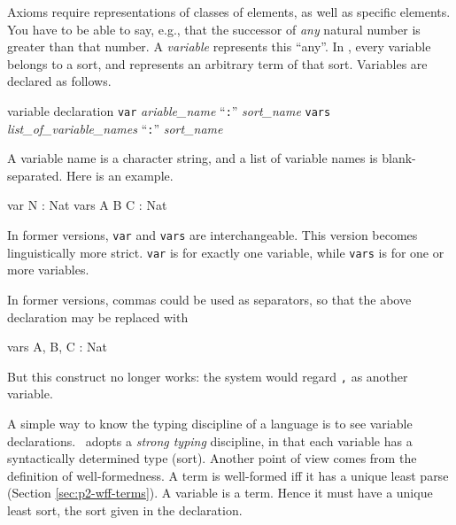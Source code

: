 \documentclass[a4paper]{memoir}
\begin{document}
Axioms require representations of classes of elements, as well as
specific elements. You have to be able to say, e.g., that
the successor of {\em any} natural number is greater than that number.
A {\em variable} represents this ``any''.
In \cafeobj, every variable belongs to a sort, and represents an arbitrary
term of that sort.
Variables are declared as follows.

\begin{bsyntax} variable declaration  \Hline
\texttt{var} \textit{ariable\_name} ``\texttt{:}'' \textit{sort\_name}
\texttt{vars} \textit{list\_of\_variable\_names} ``\texttt{:}'' \textit{sort\_name}
\end{bsyntax}

A variable name is a character string, and a list of variable names
is blank-separated. Here is an example.
\begin{vvtm}
\begin{ccode}
  var N : Nat 
  vars A B C : Nat
\end{ccode}
\end{vvtm}
\begin{warning}
  In former versions, \verb|var| and \verb|vars| are interchangeable.
  This version becomes linguistically more strict.
  \verb|var| is for exactly one variable, while \verb|vars| is for
  one or more variables.
\end{warning}

\begin{warning}
  In former versions, commas could be used as separators, so that the
  above  declaration may be replaced with
  \begin{vvtm}
\begin{ccode}
    vars A, B, C : Nat
  \end{ccode}
\end{vvtm}
  But this construct no longer works: the system would regard \verb|,| as
  another variable.
\end{warning}

A simple way to know the typing discipline of a language is to see
variable declarations. \cafeobj~adopts a {\em strong typing}
 discipline,
in that each variable has a syntactically determined type (sort). Another
point of view comes from the definition of well-formedness. A term
is well-formed iff it has a unique least parse
(Section \ref{sec:p2-wff-terms}). A variable is a term.
Hence it must have a unique least sort, the sort given in the
declaration.
\end{document}

